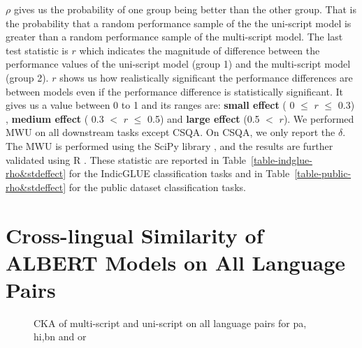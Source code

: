 \documentclass[11pt]{article}
\begin{document}
$\rho$ gives us the probability of one group being better than the other group. That is the probability that a random performance sample of the the uni-script model is greater than a random performance sample of the multi-script  model. The last test statistic is $r$ which indicates the magnitude of difference between the performance values of the uni-script model (group 1) and the multi-script model (group 2). $r$ shows us how realistically significant the performance differences are between models even if the performance difference is statistically significant. It gives us a value between 0 to 1 and its ranges are: \textbf{small effect}  ( 0 $\leq$ $r$ $\leq$ 0.3) , \textbf{medium effect} ( 0.3 $<$ $r$ $\leq$ 0.5) and \textbf{large effect} (0.5 $<$ $r$). We performed MWU on all downstream tasks except CSQA. On CSQA, we only report the $\delta$. The MWU is performed using the SciPy library \citep{2020SciPy-NMeth}, and the results are further validated using R \citep{sjstats}. These statistic are reported in Table~\ref{table-indglue-rho&stdeffect} for the IndicGLUE classification tasks and in Table~\ref{table-public-rho&stdeffect} for the public dataset classification tasks.



\section{Cross-lingual Similarity of ALBERT Models on All Language Pairs}
\label{sec:app_cka}
\begin{figure*}[hbt!]
\begin{center}
\centering
{}
\hfill
{}
\hfill
{}
\hfill
{}
\hfill
{}
\hfill
{}
\hfill
{}
\hfill
{}
\hfill

\caption{CKA of multi-script and uni-script on all language pairs for pa, hi,bn and or}
\label{cka_all_language_pairs_pa_to_or}
\end{center}
\end{figure*}
\end{document}
